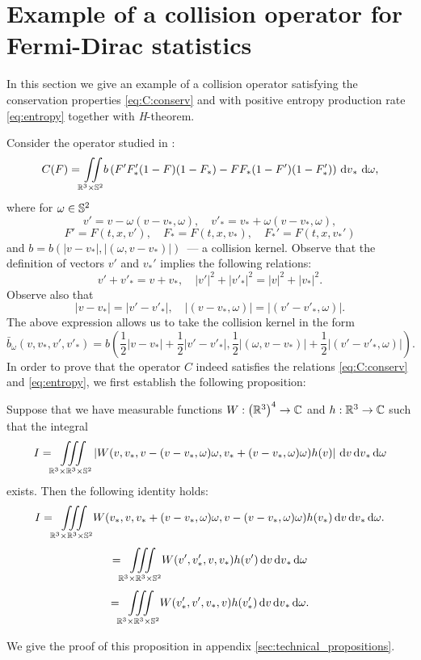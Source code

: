 \section[Example of a collision operator for Fermi-Dirac statistics][Example of a collision operator]{Example of a collision operator for Fermi-Dirac statistics} %
\label{sec:example}

In this section we give an example of a collision operator satisfying the conservation properties \eqref{eq:C:conserv} and with positive entropy production rate \eqref{eq:entropy} together with \textit{H}-theorem.

Consider the operator studied in \cite{Dolbeault1994FD}:
\begin{equation}
C(F) = {\iint\limits_{\mathbb R^3\times\mathbb S^2}} b\left(F'F'_\ast(1-F)(1-F_\ast)-FF_\ast(1-F')(1-F'_\ast)\right) {\,\mathrm{d} v}_\ast\,{\,\mathrm{d} \omega},
\end{equation}
where for $\omega\in{\mathbb {S}^2}$ \[v' = v-\omega (v-v_\ast,\omega),\quad v'_\ast= v_\ast+\omega (v-v_\ast,\omega),\]
\[F'=F(t,x,v'), \quad F_\ast=F(t,x,v_\ast),\quad F_\ast'=F(t,x,v_\ast')\]
and $b=b(|v-v_\ast|,|(\omega,v-v_\ast)|)$~--- a collision kernel. Observe that the definition of vectors $v'$ and $v_\ast'$ implies the following relations:
\begin{equation}\label{eq:v:conserv}
 	 v'+v'_\ast=v +v _\ast ,\quad|v'|^2+|v'_\ast|^2=|v|^2 +|v _\ast|^2.  
 \end{equation}
Observe also that \begin{equation*}
	|v-v_\ast|=|v'-v'_\ast|, \quad |(v-v_\ast,\omega)|=|(v'-v'_\ast,\omega)|.
\end{equation*}
The above expression allows us to take the collision kernel in the form 
\begin{equation}\label{eq:b:trick}
	\bar b_\omega (v,v_\ast,v',v'_\ast)= b\left(\frac 12|v-v_\ast|+\frac 12|v'-v'_\ast|,\frac 12|(\omega,v-v_\ast)|+\frac 12|(v'-v'_\ast,\omega)|\right).
\end{equation}
In order to prove that the operator $C$ indeed satisfies the relations \eqref{eq:C:conserv} and \eqref{eq:entropy}, we first establish the following proposition:
\begin{proposition}\label{pr:tech}
	Suppose that we have measurable functions  $W:\left({\mathbb {R}^3}\right)^4\to\mathbb C$ and $h:{\mathbb {R}^3}\to \mathbb C$ such that the integral
	\[I={\iiint\limits_{\mathbb R^3\times\mathbb R^3\times\mathbb S^2}} \left|W(v,v_\ast,v-(v-v_\ast,\omega)\omega,v_\ast+(v-v_\ast,\omega)\omega)h(v)\right|{\,\mathrm{d} v}{\,\mathrm{d} v}_\ast{\,\mathrm{d} \omega}\] exists.
	Then the following identity holds:
	\[I= 
	{\iiint\limits_{\mathbb R^3\times\mathbb R^3\times\mathbb S^2}} W(v_\ast,v,v_\ast+(v-v_\ast,\omega)\omega,v-(v-v_\ast,\omega)\omega)h(v_\ast){\,\mathrm{d} v}{\,\mathrm{d} v}_\ast{\,\mathrm{d} \omega}.\]
	\[={\iiint\limits_{\mathbb R^3\times\mathbb R^3\times\mathbb S^2}} W(v',v'_\ast,v,v_\ast)h(v'){\,\mathrm{d} v}{\,\mathrm{d} v}_\ast{\,\mathrm{d} \omega}\]
	\[={\iiint\limits_{\mathbb R^3\times\mathbb R^3\times\mathbb S^2}} W(v'_\ast,v' ,v_\ast,v)h(v'_\ast){\,\mathrm{d} v}{\,\mathrm{d} v}_\ast{\,\mathrm{d} \omega}.\]
\end{proposition}
We give the proof of this proposition in appendix \ref{sec:technical_propositions}.

